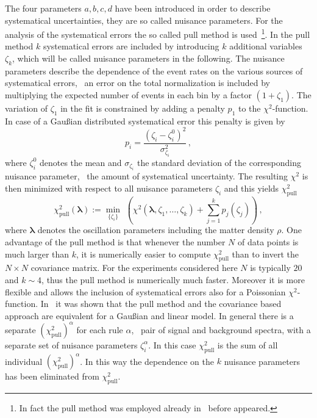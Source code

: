 The four parameters $a,b,c,d$ have been introduced in order to describe
systematical uncertainties, they are so called nuisance parameters.
For the analysis of the systematical errors the so called 
 pull method is 
used~\cite{Fogli:2002pt}\footnote{In fact the pull method
was employed already in~\cite{SBvNF} before \cite{Fogli:2002pt} appeared.}. 
In the  pull method $k$ systematical errors are included by introducing 
$k$ additional variables $\zeta_k$, which will  be called 
nuisance parameters in the following. 
The nuisance parameters describe the dependence of the event rates on the 
various sources of systematical errors, \eg\ an error on the total 
normalization is included by multiplying the expected number of events in 
each bin by a factor $(1+\zeta_1)$. The variation of $\zeta_1$ in the fit 
is constrained by adding a penalty $p_1$ to the $\chi^2$-function. In case 
of a  Gau\ss ian distributed systematical error this penalty is 
given by
\begin{equation}
\label{eq:penalty}
p_i=\frac{(\zeta_i-\zeta_i^0)^2}{\sigma_{\zeta_i}^2}\,,
\end{equation}
where $\zeta_i^0$ denotes the mean and $\sigma_{\zeta_i}$ the standard 
deviation of the corresponding nuisance parameter, \ie\ the amount of 
systematical uncertainty. 
The resulting $\chi^2$ is then minimized with respect to all nuisance 
parameters $\zeta_i$ and this yields $\chi^2_\mathrm{pull}$
\begin{equation}
\chi^2_\mathrm{pull}(\boldsymbol{\lambda}):=\min_{\{\zeta_i\} } \,\, \left( 
\chi^2(\boldsymbol{\lambda},
\zeta_1, \ldots, \zeta_k)+ \sum_{j=1}^{k} p_j(\zeta_j)\right)\,,
\end{equation}
where $\boldsymbol{\lambda}$ denotes the oscillation parameters 
including the matter density
$\rho$. One advantage of the pull method is that whenever the number $N$ of 
data points is much larger than $k$, it is numerically easier to compute 
$\chi^2_\mathrm{pull}$ than to invert the $N\times N$ covariance matrix. For
the experiments considered here $N$ is typically $20$ and $k\sim 4$, thus
the pull method is numerically much faster. Moreover it is more flexible and 
allows the inclusion of systematical errors also for a 
Poissonian $\chi^2$-function.
In~\cite{Fogli:2002pt} it was shown that the pull method and the covariance
based approach are equivalent for a Gau\ss ian and linear model. In general
there is a separate $(\chi^2_\mathrm{pull})^\alpha$ for each rule $\alpha$, 
\ie\ pair of signal and background spectra, with a separate set of 
nuisance parameters $\zeta_i^\alpha$. In this case $\chi^2_\mathrm{pull}$
is the sum of all individual  $(\chi^2_\mathrm{pull})^\alpha$.
In this way the dependence on the $k$ nuisance parameters has been eliminated 
from $\chi^2_\mathrm{pull}$. 


